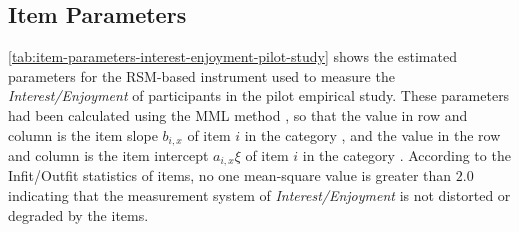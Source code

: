 
\subsection{Item Parameters}

\autoref{tab:item-parameters-interest-enjoyment-pilot-study} shows the estimated parameters for the RSM-based instrument used to measure the \emph{Interest/Enjoyment} of participants in the pilot empirical study. These parameters had been calculated using the MML method \cite{BockAitkin1981}, so that the value in row  and column  is the item slope $b_{i,x}$ of item $i$ in the category , and the value in the row  and column  is the item intercept $a_{i,x}\xi$ of item $i$ in the category . According to the Infit/Outfit statistics of items, no one mean-square value is greater than $2.0$ indicating that the measurement system of \emph{Interest/Enjoyment} is not distorted or degraded by the items.

